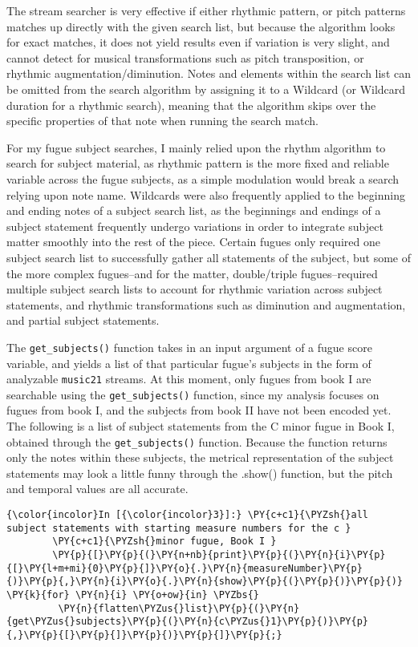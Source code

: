 The stream searcher is very effective if either rhythmic pattern, or
pitch patterns matches up directly with the given search list, but
because the algorithm looks for exact matches, it does not yield results
even if variation is very slight, and cannot detect for musical
transformations such as pitch transposition, or rhythmic
augmentation/diminution. Notes and elements within the search list can
be omitted from the search algorithm by assigning it to a Wildcard (or
Wildcard duration for a rhythmic search), meaning that the algorithm
skips over the specific properties of that note when running the search
match.

For my fugue subject searches, I mainly relied upon the rhythm algorithm
to search for subject material, as rhythmic pattern is the more fixed
and reliable variable across the fugue subjects, as a simple modulation
would break a search relying upon note name. Wildcards were also
frequently applied to the beginning and ending notes of a subject search
list, as the beginnings and endings of a subject statement frequently
undergo variations in order to integrate subject matter smoothly into
the rest of the piece. Certain fugues only required one subject search
list to successfully gather all statements of the subject, but some of
the more complex fugues--and for the matter, double/triple
fugues--required multiple subject search lists to account for rhythmic
variation across subject statements, and rhythmic transformations such
as diminution and augmentation, and partial subject statements.

The \texttt{get\_subjects()} function takes in an input argument of a
fugue score variable, and yields a list of that particular fugue's
subjects in the form of analyzable \texttt{music21} streams. At this
moment, only fugues from book I are searchable using the
\texttt{get\_subjects()} function, since my analysis focuses on fugues
from book I, and the subjects from book II have not been encoded yet.
The following is a list of subject statements from the C minor fugue in
Book I, obtained through the \texttt{get\_subjects()} function. Because
the function returns only the notes within these subjects, the metrical
representation of the subject statements may look a little funny through
the .show() function, but the pitch and temporal values are all
accurate.

    \begin{Verbatim}[commandchars=\\\{\}]
{\color{incolor}In [{\color{incolor}3}]:} \PY{c+c1}{\PYZsh{}all subject statements with starting measure numbers for the c }
        \PY{c+c1}{\PYZsh{}minor fugue, Book I }
        \PY{p}{[}\PY{p}{(}\PY{n+nb}{print}\PY{p}{(}\PY{n}{i}\PY{p}{[}\PY{l+m+mi}{0}\PY{p}{]}\PY{o}{.}\PY{n}{measureNumber}\PY{p}{)}\PY{p}{,}\PY{n}{i}\PY{o}{.}\PY{n}{show}\PY{p}{(}\PY{p}{)}\PY{p}{)} \PY{k}{for} \PY{n}{i} \PY{o+ow}{in} \PYZbs{}
         \PY{n}{flatten\PYZus{}list}\PY{p}{(}\PY{n}{get\PYZus{}subjects}\PY{p}{(}\PY{n}{c\PYZus{}1}\PY{p}{)}\PY{p}{,}\PY{p}{[}\PY{p}{]}\PY{p}{)}\PY{p}{]}\PY{p}{;}
\end{Verbatim}


